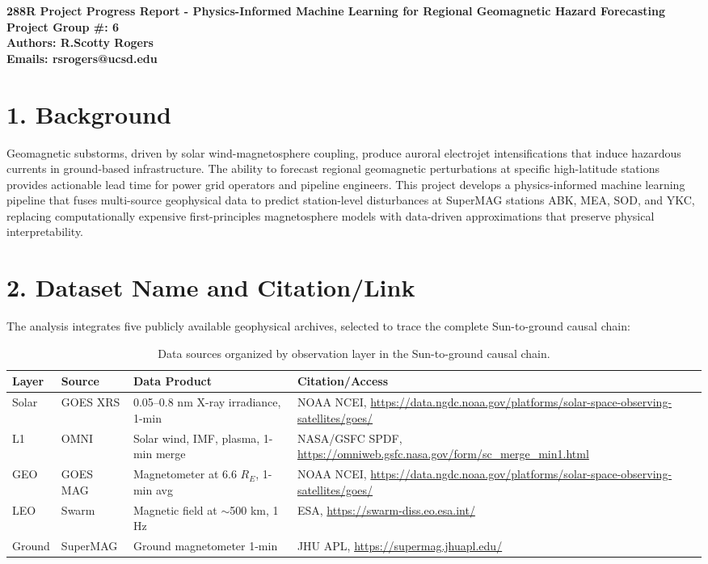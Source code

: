 \documentclass{article}
\begin{document}
\begin{center}
\Large\textbf{288R Project Progress Report - Physics-Informed Machine Learning for Regional Geomagnetic Hazard Forecasting}\\
\Large\textbf{Project Group \#: 6}\\
\Large\textbf{Authors: R.Scotty Rogers}\\
\Large\textbf{Emails: rsrogers@ucsd.edu}\\
\end{center}

\section*{1. Background}

Geomagnetic substorms, driven by solar wind-magnetosphere coupling, produce auroral electrojet intensifications that induce hazardous currents in ground-based infrastructure. The ability to forecast regional geomagnetic perturbations at specific high-latitude stations provides actionable lead time for power grid operators and pipeline engineers. This project develops a physics-informed machine learning pipeline that fuses multi-source geophysical data to predict station-level disturbances at SuperMAG stations ABK, MEA, SOD, and YKC, replacing computationally expensive first-principles magnetosphere models with data-driven approximations that preserve physical interpretability.

\section*{2. Dataset Name and Citation/Link}

The analysis integrates five publicly available geophysical archives, selected to trace the complete Sun-to-ground causal chain:

\begin{table}[H]
\centering
\begin{tabular}{lllp{5cm}}
\toprule
\textbf{Layer} & \textbf{Source} & \textbf{Data Product} & \textbf{Citation/Access} \\
\midrule
Solar & GOES XRS & 0.05--0.8 nm X-ray irradiance, 1-min & NOAA NCEI, \url{https://data.ngdc.noaa.gov/platforms/solar-space-observing-satellites/goes/} \\
L1 & OMNI & Solar wind, IMF, plasma, 1-min merge & NASA/GSFC SPDF, \url{https://omniweb.gsfc.nasa.gov/form/sc_merge_min1.html} \\
GEO & GOES MAG & Magnetometer at 6.6 $R_E$, 1-min avg & NOAA NCEI, \url{https://data.ngdc.noaa.gov/platforms/solar-space-observing-satellites/goes/} \\
LEO & Swarm & Magnetic field at $\sim$500 km, 1 Hz & ESA, \url{https://swarm-diss.eo.esa.int/} \\
Ground & SuperMAG & Ground magnetometer 1-min & JHU APL, \url{https://supermag.jhuapl.edu/} \\
\bottomrule
\end{tabular}
\caption{Data sources organized by observation layer in the Sun-to-ground causal chain.}
\end{table}
\end{document}
